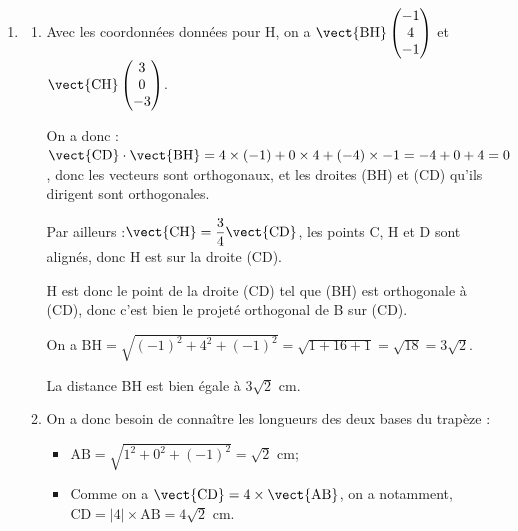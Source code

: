 \begin{enumerate}
\begin{enumerate}
	Dans le repère orthonormé \Oijk{}, on a donc :

	$\begin{aligned}[t] \mathrm{SI} &= \sqrt{\left(x_\mathrm{I} - x_{\mathrm{S}}\right)^2 +\left(y_\mathrm{I} - y_{\mathrm{S}}\right)^2 +\left(z_\mathrm{I} - z_{\mathrm{S}}\right)^2 } = \sqrt{\left(\dfrac{2}{3}-2\right)^2 + \left(\dfrac{1}{3} - 1\right)^2 + \left(\dfrac{8}{3} - 4\right)^2   } \\
	&=\sqrt{\left(-\dfrac{4}{3}\right)^2 + \left(-\dfrac{2}{3}\right)^2 + \left(-\dfrac{4}{3}\right)^2  } = \sqrt{\dfrac{16}{9}+\dfrac{4}{9} + \dfrac{16}{9}} = \sqrt{\dfrac{36}{9}} = \sqrt{4} = 2 \end{aligned}$

	On arrive bien à SI = 2 unités graphique, et comme \Oijk{} est d'unité graphique 1 cm, on a bien SI = 2 cm.
\end{enumerate}
\item \begin{enumerate}
	\item Avec les coordonnées données pour H, on a $\vect{\mathrm{BH}} \begin{pmatrix}-1 \\ 4\\-1\end{pmatrix}$ et $\vect{\mathrm{CH}} \begin{pmatrix}3 \\ 0\\-3\end{pmatrix}$.

	On a donc : \quad $\vect{\mathrm{CD}}\cdot\vect{\mathrm{BH}} = 4\times (-1) + 0\times 4 + (-4) \times -1 = -4 + 0 + 4 = 0$, donc les vecteurs sont orthogonaux, et les droites (BH) et (CD) qu'ils dirigent sont orthogonales.

	Par ailleurs  :\quad $\vect{\mathrm{CH}} = \dfrac{3}{4}\vect{\mathrm{CD}}$, les points C, H et D sont alignés, donc H est sur la droite (CD).

	H est donc le point de la droite (CD) tel que (BH) est orthogonale à (CD), donc c'est bien le projeté orthogonal de B sur (CD).

	On a $\mathrm{BH} = \sqrt{(-1)^2 + 4^2 + (-1)^2 } = \sqrt{1 + 16 + 1} = \sqrt{18} = 3\sqrt{2}$.

	La distance BH est bien égale à $3\sqrt{2}$ cm.

	\item On a donc besoin de connaître les longueurs des deux bases du trapèze :
	\begin{itemize}
		\item $\mathrm{AB} = \sqrt{1^2 + 0^2 + (-1)^2} = \sqrt{2}$ cm;
		\item Comme on a $\vect{\mathrm{CD}} = 4\times \vect{\mathrm{AB}}$, on a notamment, $\mathrm{CD} = \left|4\right|\times \mathrm{AB} = 4\sqrt{2}$ cm.
	\end{itemize}


\end{enumerate}
\end{enumerate}
